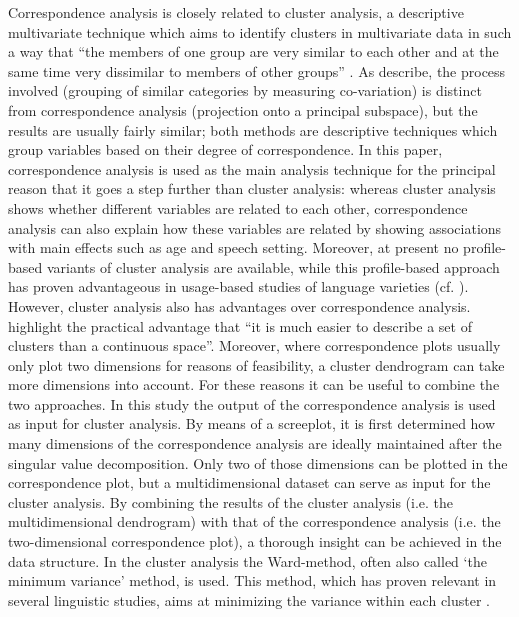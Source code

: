 \documentclass[output=paper]{LSP/langsci}
\begin{document}
Correspondence analysis is closely related to cluster analysis, a descriptive multivariate technique which aims to identify clusters in multivariate data in such a way that “the members of one group are very similar to each other and at the same time very dissimilar to members of other groups” \citep[337]{gries_statistics_2013}. As \citet{lebart_correspondence_1993} describe, the process involved (grouping of similar categories by measuring co-variation) is distinct from correspondence analysis (projection onto a principal subspace), but the results are usually fairly similar; both methods are descriptive techniques which group variables based on their degree of correspondence. In this paper, correspondence analysis is used as the main analysis technique for the principal reason that it goes a step further than cluster analysis: whereas cluster analysis shows whether different variables are related to each other, correspondence analysis can also explain how these variables are related by showing associations with main effects such as age and speech setting. Moreover, at present no profile-based variants of cluster analysis are available, while this profile-based approach has proven advantageous in usage-based studies of language varieties (cf. \citealt{speelman_profile-based_2003}). However, cluster analysis also has advantages over correspondence analysis. \citet[15]{lebart_correspondence_1993} highlight the practical advantage that “it is much easier to describe a set of clusters than a continuous space”. Moreover, where correspondence plots usually only plot two dimensions for reasons of feasibility, a cluster dendrogram can take more dimensions into account. For these reasons it can be useful to combine the two approaches. In this study the output of the correspondence analysis is used as input for cluster analysis. By means of a screeplot, it is first determined how many dimensions of the correspondence analysis are ideally maintained after the singular value decomposition. Only two of those dimensions can be plotted in the correspondence plot, but a multidimensional dataset can serve as input for the cluster analysis. By combining the results of the cluster analysis (i.e. the multidimensional dendrogram) with that of the correspondence analysis (i.e. the two-dimensional correspondence plot), a thorough insight can be achieved in the data structure. In the cluster analysis the Ward-method, often also called ‘the minimum variance’ method, is used. This method, which has proven relevant in several linguistic studies, aims at minimizing the variance within each cluster \citep[317]{gries_statistics_2013}.
\end{document}
